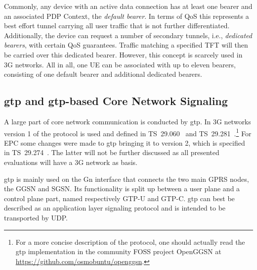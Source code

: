 Commonly, any device with an active data connection has at least one bearer and an associated \gls{PDP} Context, the \textit{default bearer}. In terms of \gls{QoS} this represents a best effort tunnel carrying all user traffic that is not further differentiated. Additionally, the device can request a number of secondary tunnels, i.e., \textit{dedicated bearers}, with certain \gls{QoS} guarantees. Traffic matching a specified \gls{TFT} will then be carried over this dedicated bearer. However, this concept is scarcely used in \gls{3G} networks. All in all, one \gls{UE} can be associated with up to eleven bearers, consisting of one default bearer and additional dedicated bearers.


\subsection{\texorpdfstring{\acrshort{gtp}}{GTP} and \texorpdfstring{\acrshort{gtp}}{GTP}-based Core Network Signaling}
\label{c4:sec:gtp}

A large part of core network communication is conducted by \gls{gtp}. In \gls{3G} networks version 1 of the protocol is used and defined in \gls{TS}~29.060~\cite{3gpp.29.060} and \gls{TS}~29.281~\cite{3gpp.29.281}.\footnote{For a more concise description of the protocol, one should actually read the \gls{gtp} implementation in the community \gls{FOSS} project OpenGGSN at \url{https://github.com/osmobuntu/openggsn}.} For \gls{EPC} some changes were made to \gls{gtp} bringing it to version 2, which is specified in \gls{TS}~29.274~\cite{3gpp.29.274}. The latter will not be further discussed as all presented evaluations will have a \gls{3G} network as basis.

\gls{gtp} is mainly used on the Gn interface that connects the two main \gls{GPRS} nodes, the \gls{GGSN} and \gls{SGSN}. Its functionality is split up between a user plane and a control plane part, named respectively \gls{GTP-U} and \gls{GTP-C}. \gls{gtp} can best be described as an application layer signaling protocol and is intended to be transported by \gls{UDP}.

